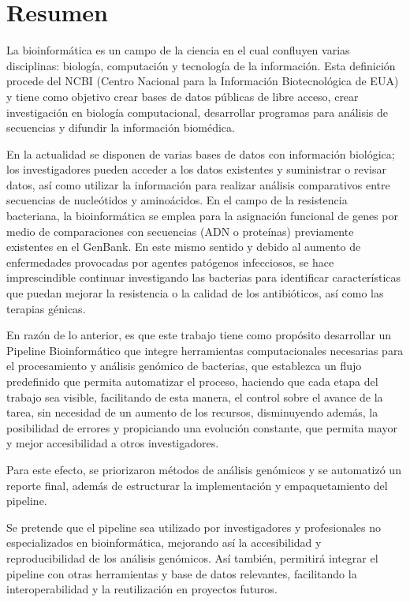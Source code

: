 \documentclass[12pt]{article}
\begin{document}

\newpage
{
    \hypersetup{linkcolor=black} %
    \tableofcontents %
}
\newpage
{
    \hypersetup{linkcolor=black} %
    \listoftables %
}
\newpage
{
    \hypersetup{linkcolor=black} %
    \listoffigures %
}
\newpage
\section*{Resumen}
La bioinformática es un campo de la ciencia en el cual confluyen varias disciplinas: biología, computación y tecnología de la información. Esta definición procede del NCBI (Centro Nacional para la Información Biotecnológica de EUA) y tiene como objetivo crear bases de datos públicas de libre acceso, crear investigación en biología computacional, desarrollar programas para análisis de secuencias y difundir la información biomédica.\par 
En la actualidad se disponen de varias bases de datos con información biológica; los investigadores pueden acceder a los datos existentes y suministrar o revisar datos, así como utilizar la información para realizar análisis comparativos entre secuencias de nucleótidos y aminoácidos. En el campo de la resistencia bacteriana, la bioinformática se emplea para la asignación funcional de genes por medio de comparaciones con secuencias (ADN o proteínas) previamente existentes en el GenBank. En este mismo sentido y debido al aumento de enfermedades provocadas por agentes patógenos infecciosos, se hace imprescindible continuar investigando las bacterias para identificar características que puedan mejorar  la resistencia o la calidad de los antibióticos, así como las terapias génicas.\par
En razón de lo anterior, es que este trabajo tiene como propósito desarrollar un Pipeline Bioinformático que integre herramientas  computacionales necesarias para el procesamiento y  análisis genómico de bacterias, que establezca un flujo predefinido que permita automatizar el proceso, haciendo que cada etapa del trabajo sea visible, facilitando de esta manera, el control sobre el avance de la tarea, sin necesidad de un aumento de los recursos,  disminuyendo además, la posibilidad de errores y  propiciando una evolución constante, que permita mayor y mejor accesibilidad a otros investigadores.\par
Para este efecto, se priorizaron métodos de análisis genómicos y se automatizó un reporte final, además de estructurar la implementación y empaquetamiento del pipeline.\par
Se pretende que el pipeline sea utilizado por investigadores y profesionales no especializados en bioinformática, mejorando así la accesibilidad y reproducibilidad  de los análisis genómicos. Así también, permitirá integrar el pipeline con otras herramientas y base de datos relevantes, facilitando la interoperabilidad y la reutilización en proyectos futuros.\par
\end{document}
